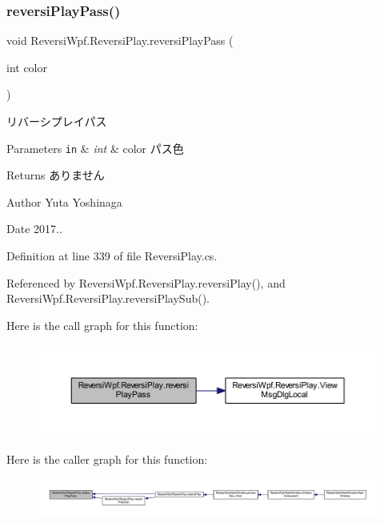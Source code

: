 \subsubsection{\texorpdfstring{reversi\+Play\+Pass()}{reversiPlayPass()}}
{\footnotesize\ttfamily void Reversi\+Wpf.\+Reversi\+Play.\+reversi\+Play\+Pass (\begin{DoxyParamCaption}\item[{int}]{color }\end{DoxyParamCaption})}



リバーシプレイパス 


\begin{DoxyParams}[1]{Parameters}
\mbox{\tt in}  & {\em int} & color パス色 \\
\hline
\end{DoxyParams}
\begin{DoxyReturn}{Returns}
ありません 
\end{DoxyReturn}
\begin{DoxyAuthor}{Author}
Yuta Yoshinaga 
\end{DoxyAuthor}
\begin{DoxyDate}{Date}
2017.. 
\end{DoxyDate}


Definition at line 339 of file Reversi\+Play.\+cs.



Referenced by Reversi\+Wpf.\+Reversi\+Play.\+reversi\+Play(), and Reversi\+Wpf.\+Reversi\+Play.\+reversi\+Play\+Sub().

Here is the call graph for this function\+:\nopagebreak
\begin{figure}[H]
\begin{center}
\leavevmode
\includegraphics[width=350pt]{class_reversi_wpf_1_1_reversi_play_a3aca2f66c873be50dca194a396d34bd7_cgraph}
\end{center}
\end{figure}
Here is the caller graph for this function\+:\nopagebreak
\begin{figure}[H]
\begin{center}
\leavevmode
\includegraphics[width=350pt]{class_reversi_wpf_1_1_reversi_play_a3aca2f66c873be50dca194a396d34bd7_icgraph}
\end{center}
\end{figure}
\mbox{\label{class_reversi_wpf_1_1_reversi_play_ae7e23ef808336291a39f0ac37687d1dc}} 

